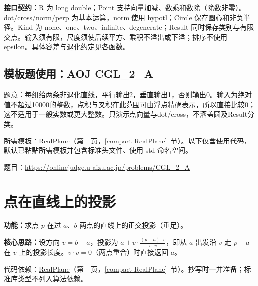 {\sloppy{}\noindent\textbf{接口契约：}R 为 long double；Point 支持向量加减、数乘和数除（除数非零）。dot/cross/norm/perp 为基本运算，norm 使用 hypotl；Circle 保存圆心和非负半径。Kind 为 none、one、two、infinite、degenerate；Result 同时保存类别与有限交点。输入须有限，尺度须使后续平方、乘积不溢出或下溢；排序不使用 epsilon。具体容差与退化约定见各函数。\par}



\Needspace{310pt}



\Needspace{389pt}

\subsection*{模板题使用：AOJ CGL\_2\_A}

\label{usage-example-180}

题意：每组给两条非退化直线，平行输出2，垂直输出1，否则输出0。输入为绝对值不超过10000的整数，点积与叉积在此范围可由浮点精确表示，所以直接比较0；这不适用于一般实数或更大整数。只演示点向量与dot/cross，不涵盖圆及Result分类。

所需模板：\hyperref[compact-RealPlane]{RealPlane}（第~\pageref{compact-RealPlane}~页，\ref{compact-RealPlane}~节）。以下仅含使用代码，默认已粘贴所需模板并包含标准头文件、使用 std 命名空间。

题目：\url{https://onlinejudge.u-aizu.ac.jp/problems/CGL_2_A}



\Needspace{277pt}

\section{点在直线上的投影}\label{compact-line_projection}

\noindent\textbf{功能：}\allowbreak 求点 $p$ 在过 $a$、$b$ 两点的直线上的正交投影（垂足）。

\textbf{核心思路：}\allowbreak 设方向 $v=b-a$，投影为 $a+v\cdot\frac{(p-a)\cdot v}{v\cdot v}$，即从 $a$ 出发沿 $v$ 走 $p-a$ 在 $v$ 上的投影长度。$v\cdot v=0$（两点重合）时直接返回 $a$。

代码依赖：\hyperref[compact-RealPlane]{RealPlane}（第~\pageref{compact-RealPlane}~页，\ref{compact-RealPlane}~节）。抄写时一并准备；标准库类型不列入算法依赖。

